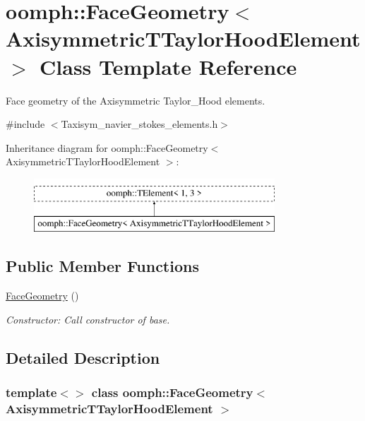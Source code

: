 \hypertarget{classoomph_1_1FaceGeometry_3_01AxisymmetricTTaylorHoodElement_01_4}{}\section{oomph\+:\+:Face\+Geometry$<$ Axisymmetric\+T\+Taylor\+Hood\+Element $>$ Class Template Reference}
\label{classoomph_1_1FaceGeometry_3_01AxisymmetricTTaylorHoodElement_01_4}


Face geometry of the Axisymmetric Taylor\+\_\+\+Hood elements.  




{\ttfamily \#include $<$Taxisym\+\_\+navier\+\_\+stokes\+\_\+elements.\+h$>$}

Inheritance diagram for oomph\+:\+:Face\+Geometry$<$ Axisymmetric\+T\+Taylor\+Hood\+Element $>$\+:\begin{figure}[H]
\begin{center}
\leavevmode
\includegraphics[height=2.000000cm]{classoomph_1_1FaceGeometry_3_01AxisymmetricTTaylorHoodElement_01_4}
\end{center}
\end{figure}
\subsection*{Public Member Functions}
\begin{DoxyCompactItemize}
\item 
\hyperlink{classoomph_1_1FaceGeometry_3_01AxisymmetricTTaylorHoodElement_01_4_aa94b9d3d1d05bc595a22ccbd0a1b0c78}{Face\+Geometry} ()
\begin{DoxyCompactList}\small\item\em Constructor\+: Call constructor of base. \end{DoxyCompactList}\end{DoxyCompactItemize}


\subsection{Detailed Description}
\subsubsection*{template$<$$>$\newline
class oomph\+::\+Face\+Geometry$<$ Axisymmetric\+T\+Taylor\+Hood\+Element $>$}

